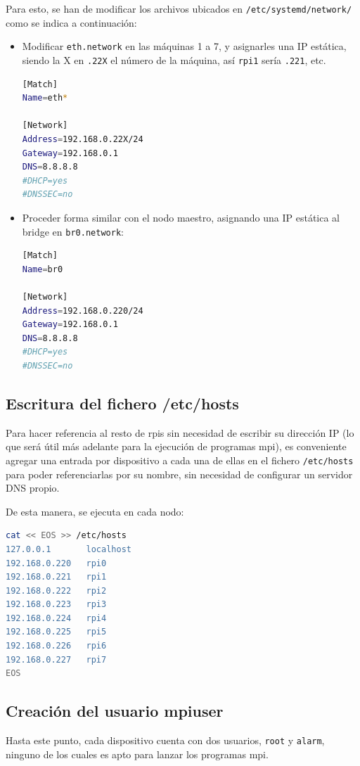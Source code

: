 Para esto, se han de modificar los archivos ubicados en \texttt{/etc/systemd/network/} como se indica a continuación:

\begin{itemize}
    \item Modificar \texttt{eth.network} en las máquinas 1 a 7, y asignarles una IP estática, siendo la X en \texttt{.22X} el número de la máquina, así \texttt{rpi1} sería \texttt{.221}, etc.
\begin{lstlisting}[language=bash]
[Match]
Name=eth*

[Network]
Address=192.168.0.22X/24
Gateway=192.168.0.1
DNS=8.8.8.8
#DHCP=yes
#DNSSEC=no
\end{lstlisting}
    \item Proceder forma similar con el nodo maestro, asignando una IP estática al bridge en \texttt{br0.network}:
\begin{lstlisting}[language=bash]
[Match]
Name=br0

[Network]
Address=192.168.0.220/24
Gateway=192.168.0.1
DNS=8.8.8.8
#DHCP=yes
#DNSSEC=no
\end{lstlisting}
\end{itemize}

\subsection{Escritura del fichero /etc/hosts}
Para hacer referencia al resto de \acrshort{rpi}s sin necesidad de escribir su dirección IP (lo que será útil más adelante para la ejecución de programas \acrshort{mpi}), es conveniente agregar una entrada por dispositivo a cada una de ellas en el fichero \texttt{/etc/hosts} para poder referenciarlas por su nombre, sin necesidad de configurar un servidor DNS propio.

De esta manera, se ejecuta en cada nodo:
\begin{lstlisting}[language=bash]
cat << EOS >> /etc/hosts
127.0.0.1       localhost
192.168.0.220   rpi0
192.168.0.221   rpi1
192.168.0.222   rpi2
192.168.0.223   rpi3
192.168.0.224   rpi4
192.168.0.225   rpi5
192.168.0.226   rpi6
192.168.0.227   rpi7
EOS
\end{lstlisting}

\subsection{Creación del usuario mpiuser}
Hasta este punto, cada dispositivo cuenta con dos usuarios, \texttt{root} y \texttt{alarm}, ninguno de los cuales es apto para lanzar los programas \acrshort{mpi}.

